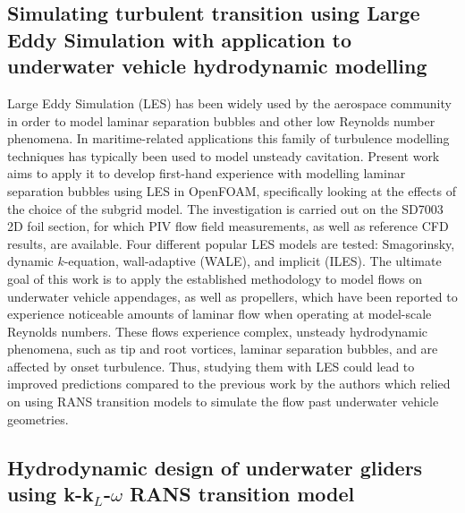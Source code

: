 \documentclass[a4paper,10pt]{article}
\begin{document}
\subsection{Simulating turbulent transition using Large Eddy Simulation with application to underwater vehicle hydrodynamic modelling \cite{Lidtke2017a}}

	Large Eddy Simulation (LES) has been widely used by the aerospace community in order to model laminar separation bubbles and other low Reynolds number phenomena. In maritime-related applications this family of turbulence modelling techniques has typically been used to model unsteady cavitation. Present work aims to apply it to develop first-hand experience with modelling laminar separation bubbles using LES in OpenFOAM, specifically looking at the effects of the choice of the subgrid model. The investigation is carried out on the SD7003 2D foil section, for which PIV flow field measurements, as well as reference CFD results, are available. Four different popular LES models are tested: Smagorinsky, dynamic $k$-equation, wall-adaptive (WALE), and implicit (ILES). The ultimate goal of this work is to apply the established methodology to model flows on underwater vehicle appendages, as well as propellers, which have been reported to experience noticeable amounts of laminar flow when operating at model-scale Reynolds numbers. These flows experience complex, unsteady hydrodynamic phenomena, such as tip and root vortices, laminar separation bubbles, and are affected by onset turbulence. Thus, studying them with LES could lead to improved predictions compared to the previous work by the authors which relied on using RANS transition models to simulate the flow past underwater vehicle geometries.

\subsection{Hydrodynamic design of underwater gliders using k-k$_L$-$\omega$ RANS transition model \cite{Lidtke2017}}
\end{document}
